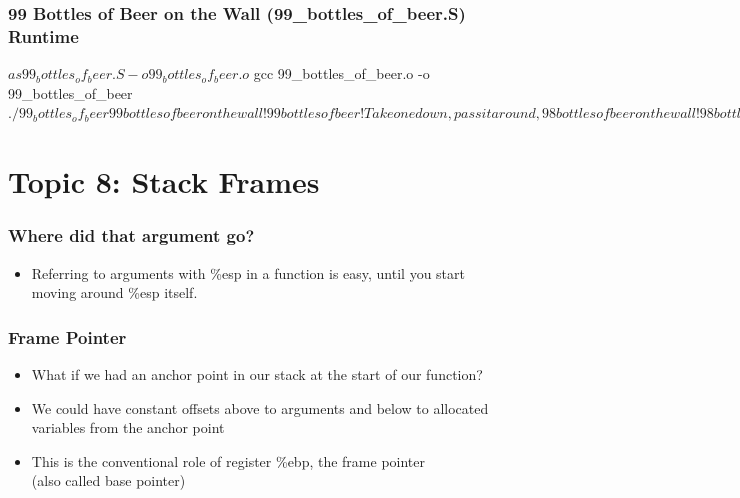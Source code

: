 \documentclass[11pt,xcolor=dvipsnames]{beamer}
\newcommand{\mvs}{\vspace{-0.95em}}
\begin{document}
\begin{frame}[fragile,t]
\mvs
\frametitle{99 Bottles of Beer on the Wall (99\_bottles\_of\_beer.S) Runtime}
\begin{textcode}
$ as 99_bottles_of_beer.S -o 99_bottles_of_beer.o
$ gcc 99_bottles_of_beer.o -o 99_bottles_of_beer
$ ./99_bottles_of_beer
99 bottles of beer on the wall! 99 bottles of beer!
Take one down, pass it around, 98 bottles of beer on the wall!
98 bottles of beer on the wall! 98 bottles of beer!
Take one down, pass it around, 97 bottles of beer on the wall!
97 bottles of beer on the wall! 97 bottles of beer!
...
3 bottles of beer on the wall! 3 bottles of beer!
Take one down, pass it around, 2 bottles of beer on the wall!
2 bottles of beer on the wall! 2 bottles of beer!
Take one down, pass it around, 1 bottles of beer on the wall!
1 bottles of beer on the wall! 1 bottles of beer!
Take one down, pass it around, 0 bottles of beer on the wall!
No more bottles of beer on the wall!
$
\end{textcode}
\end{frame}

\section{Topic 8: Stack Frames}

\begin{frame}[fragile,t]
\frametitle{Where did that argument go?}
\mvs
\begin{itemize}
  \item Referring to arguments with {\ttfamily \%esp} in a function is easy, until you start moving around {\ttfamily \%esp} itself.
\end{itemize}
\end{frame}

\begin{frame}[fragile,t]
\frametitle{Frame Pointer}
\begin{itemize}
  \item What if we had an anchor point in our stack at the start of our function?
  \item We could have constant offsets above to arguments and below to allocated variables from the anchor point
  \pause
  \item This is the conventional role of register {\ttfamily \%ebp}, the frame pointer \\ (also called base pointer)
\end{itemize}
\end{frame}
\end{document}
